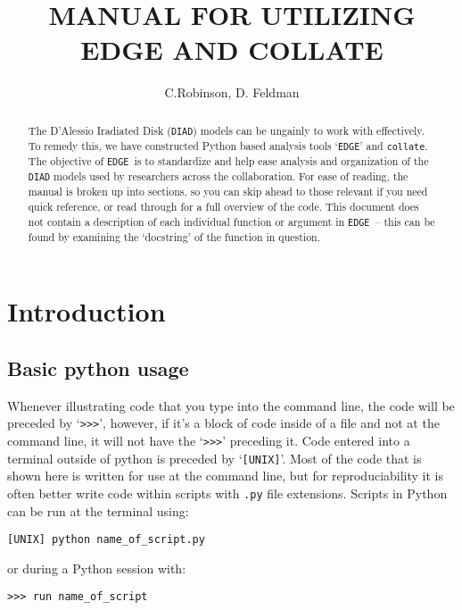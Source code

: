 \documentclass{emulateapj}
\newcommand{\edge}{\texttt{EDGE }}
\begin{document}
\title{MANUAL FOR UTILIZING EDGE AND COLLATE}


\author{C.Robinson, D. Feldman}




\begin{abstract}
The D'Alessio Iradiated Disk (\texttt{DIAD}) models can be ungainly to work with effectively. To remedy this, we have constructed Python based analysis tools `\texttt{EDGE}' and \texttt{collate}.
The objective of \edge  is to standardize and help ease analysis and organization of the \texttt{DIAD} models used by researchers across the collaboration.
For ease of reading, the manual is broken up into sections, so you can skip ahead to those relevant if you need quick reference, or read through for a full overview of the code. This document does not contain a description of each individual function or argument in \edge -- this can be found by examining the `docstring' of the function in question.
\end{abstract}

\section{Introduction}
 
\subsection{Basic python usage}
Whenever illustrating code that you type into the command line, the code will be preceded by `\texttt{>>>}', however, if it’s a block of code inside of a file and not at the command line, it will not have the `\texttt{>>>}' preceding it. Code entered into a terminal outside of python is preceded by `\texttt{[UNIX]}'. Most of the code that is shown here is written for use at the command line, but for reproduciability it is often better write code within scripts with \texttt{.py} file extensions. Scripts in Python can be run at the terminal using:

\vspace{2mm}
\texttt{[UNIX] python name\_of\_script.py}
\vspace{2mm}

or during a Python session with:

\vspace{2mm}
\texttt{>>> run name\_of\_script}
\vspace{2mm}
\end{document}
